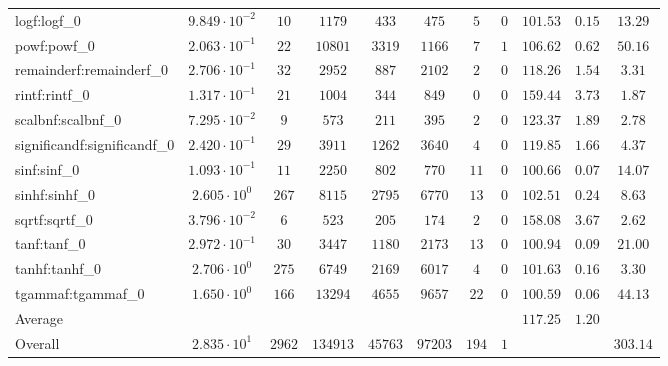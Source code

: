 \begin{tabular}{|l|c|c|c|c|c|c|c|c|c|c|}
logf:logf\_0                 & $ 9.849 \cdot 10^{-2} $ & $ 10     $ & $ 1179   $ & $ 433   $ & $ 475   $ & $ 5   $ & $ 0 $ & $ 101.53      $ & $ 0.15    $ & $ 13.29   $ \\
powf:powf\_0                 & $ 2.063 \cdot 10^{-1} $ & $ 22     $ & $ 10801  $ & $ 3319  $ & $ 1166  $ & $ 7   $ & $ 1 $ & $ 106.62      $ & $ 0.62    $ & $ 50.16   $ \\
remainderf:remainderf\_0     & $ 2.706 \cdot 10^{-1} $ & $ 32     $ & $ 2952   $ & $ 887   $ & $ 2102  $ & $ 2   $ & $ 0 $ & $ 118.26      $ & $ 1.54    $ & $ 3.31    $ \\
rintf:rintf\_0               & $ 1.317 \cdot 10^{-1} $ & $ 21     $ & $ 1004   $ & $ 344   $ & $ 849   $ & $ 0   $ & $ 0 $ & $ 159.44      $ & $ 3.73    $ & $ 1.87    $ \\
scalbnf:scalbnf\_0           & $ 7.295 \cdot 10^{-2} $ & $ 9      $ & $ 573    $ & $ 211   $ & $ 395   $ & $ 2   $ & $ 0 $ & $ 123.37      $ & $ 1.89    $ & $ 2.78    $ \\
significandf:significandf\_0 & $ 2.420 \cdot 10^{-1} $ & $ 29     $ & $ 3911   $ & $ 1262  $ & $ 3640  $ & $ 4   $ & $ 0 $ & $ 119.85      $ & $ 1.66    $ & $ 4.37    $ \\
sinf:sinf\_0                 & $ 1.093 \cdot 10^{-1} $ & $ 11     $ & $ 2250   $ & $ 802   $ & $ 770   $ & $ 11  $ & $ 0 $ & $ 100.66      $ & $ 0.07    $ & $ 14.07   $ \\
sinhf:sinhf\_0               & $ 2.605 \cdot 10^{0}  $ & $ 267    $ & $ 8115   $ & $ 2795  $ & $ 6770  $ & $ 13  $ & $ 0 $ & $ 102.51      $ & $ 0.24    $ & $ 8.63    $ \\
sqrtf:sqrtf\_0               & $ 3.796 \cdot 10^{-2} $ & $ 6      $ & $ 523    $ & $ 205   $ & $ 174   $ & $ 2   $ & $ 0 $ & $ 158.08      $ & $ 3.67    $ & $ 2.62    $ \\
tanf:tanf\_0                 & $ 2.972 \cdot 10^{-1} $ & $ 30     $ & $ 3447   $ & $ 1180  $ & $ 2173  $ & $ 13  $ & $ 0 $ & $ 100.94      $ & $ 0.09    $ & $ 21.00   $ \\
tanhf:tanhf\_0               & $ 2.706 \cdot 10^{0}  $ & $ 275    $ & $ 6749   $ & $ 2169  $ & $ 6017  $ & $ 4   $ & $ 0 $ & $ 101.63      $ & $ 0.16    $ & $ 3.30    $ \\
tgammaf:tgammaf\_0           & $ 1.650 \cdot 10^{0}  $ & $ 166    $ & $ 13294  $ & $ 4655  $ & $ 9657  $ & $ 22  $ & $ 0 $ & $ 100.59      $ & $ 0.06    $ & $ 44.13   $ \\
\hline
Average                      & $                     $ & $        $ & $        $ & $       $ & $       $ & $     $ & $   $ & $ 117.25      $ & $ 1.20    $ & $         $ \\
\hline
Overall                      & $ 2.835 \cdot 10^{1}  $ & $ 2962   $ & $ 134913 $ & $ 45763 $ & $ 97203 $ & $ 194 $ & $ 1 $ & $             $ & $         $ & $ 303.14  $ \\
\hline
\end{tabular}
